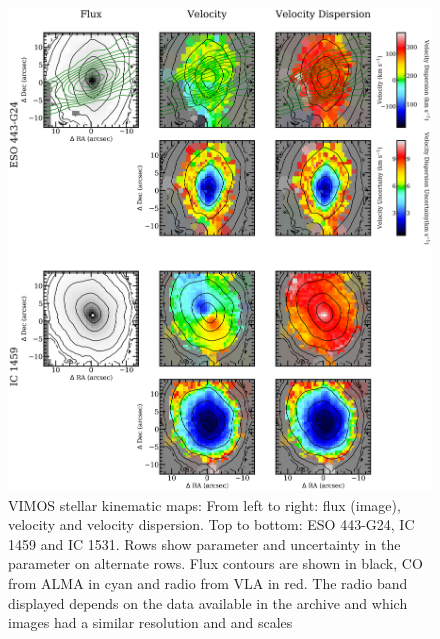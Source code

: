 		\begin{figure}
			\centering
			\includegraphics[height=0.94\textheight]{chapter4/vimos/kin1.png}
			\caption[VIMOS stellar kinematic maps]{VIMOS stellar kinematic maps: From left to right: flux (image), velocity and velocity dispersion. Top to bottom: ESO 443-G24, IC 1459 and IC 1531. Rows show parameter and uncertainty in the parameter on alternate rows. Flux contours are shown in black, CO from ALMA in cyan and radio from VLA in red. The radio band displayed depends on the data available in the archive and which images had a similar resolution and and scales}
			\label{fig:VIMOS_stellar}
		\end{figure}
